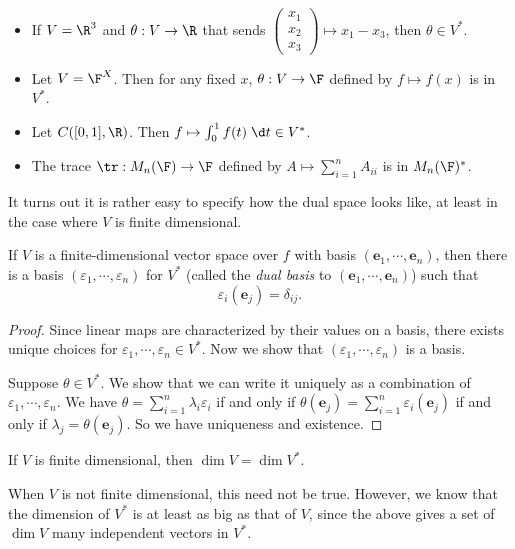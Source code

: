 \documentclass[a4paper]{article}
\begin{document}
\begin{eg}\leavevmode
  \begin{itemize}
    \item If $V = \R^3$ and $\theta: V\to \R$ that sends $\begin{pmatrix}x_1\\x_2\\x_3\end{pmatrix} \mapsto x_1 - x_3$, then $\theta \in V^*$.
    \item Let $V = \F^X$. Then for any fixed $x$, $\theta: V\to \F$ defined by $f \mapsto f(x)$ is in $V^*$.
    \item Let $C([0, 1], \R)$. Then $f \mapsto \int_0^1 f(t)\;\d t \in V^*$.
    \item The trace $\tr: M_n(\F)\to \F$ defined by $A\mapsto \sum_{i = 1}^n A_{ii}$ is in $M_n(\F)^*$.
  \end{itemize}
\end{eg}

It turns out it is rather easy to specify how the dual space looks like, at least in the case where $V$ is finite dimensional.
\begin{lemma}
  If $V$ is a finite-dimensional vector space over $f$ with basis $(\mathbf{e}_1, \cdots, \mathbf{e}_n)$, then there is a basis $(\varepsilon_1, \cdots, \varepsilon_n)$  for $V^*$ (called the \emph{dual basis} to $(\mathbf{e}_1, \cdots, \mathbf{e}_n)$) such that
  \[
    \varepsilon_i(\mathbf{e}_j) = \delta_{ij}.
  \]
\end{lemma}

\begin{proof}
  Since linear maps are characterized by their values on a basis, there exists unique choices for $\varepsilon_1, \cdots, \varepsilon_n \in V^*$. Now we show that $(\varepsilon_1, \cdots, \varepsilon_n)$ is a basis.

  Suppose $\theta \in V^*$. We show that we can write it uniquely as a combination of $\varepsilon_1, \cdots, \varepsilon_n$. We have $\theta = \sum_{i = 1}^n \lambda_i \varepsilon_i$ if and only if $\theta(\mathbf{e}_j) = \sum_{i = 1}^n \varepsilon_i(\mathbf{e}_j)$ if and only if $\lambda_j = \theta(\mathbf{e}_j)$. So we have uniqueness and existence.
\end{proof}

\begin{cor}
  If $V$ is finite dimensional, then $\dim V = \dim V^*$.
\end{cor}
When $V$ is not finite dimensional, this need not be true. However, we know that the dimension of $V^*$ is at least as big as that of $V$, since the above gives a set of $\dim V$ many independent vectors in $V^*$.
\end{document}
